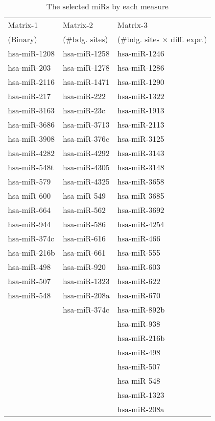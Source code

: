 \documentclass{scrartcl}
\numberwithin{figure}{section}
\numberwithin{table}{section}
\begin{document}
\begin{table}[h!]
  \centering
  \caption{The selected miRs by each measure}
  \label{tab:sel}
\bigskip
  \begin{tabular}{lll}
    \toprule
    Matrix-1     & Matrix-2     & Matrix-3     \\
    {\small(Binary)} & {\small(\#bdg. sites)} & {\small(\#bdg. sites $\times$ diff. expr.)} \\
    \midrule
    hsa-miR-1208 & hsa-miR-1258 & hsa-miR-1246 \\
    hsa-miR-203  & hsa-miR-1278 & hsa-miR-1286 \\
    hsa-miR-2116 & hsa-miR-1471 & hsa-miR-1290 \\
    hsa-miR-217  & hsa-miR-222  & hsa-miR-1322 \\
    hsa-miR-3163 & hsa-miR-23c  & hsa-miR-1913 \\
    hsa-miR-3686 & hsa-miR-3713 & hsa-miR-2113 \\
    hsa-miR-3908 & hsa-miR-376c & hsa-miR-3125 \\
    hsa-miR-4282 & hsa-miR-4292 & hsa-miR-3143 \\
    hsa-miR-548t & hsa-miR-4305 & hsa-miR-3148 \\
    hsa-miR-579  & hsa-miR-4325 & hsa-miR-3658 \\
    hsa-miR-600  & hsa-miR-549  & hsa-miR-3685 \\
    hsa-miR-664  & hsa-miR-562  & hsa-miR-3692 \\
    hsa-miR-944  & hsa-miR-586  & hsa-miR-4254 \\
    hsa-miR-374c & hsa-miR-616  & hsa-miR-466  \\
    hsa-miR-216b & hsa-miR-661  & hsa-miR-555  \\
    hsa-miR-498  & hsa-miR-920  & hsa-miR-603  \\
    hsa-miR-507  & hsa-miR-1323 & hsa-miR-622  \\
    hsa-miR-548  & hsa-miR-208a & hsa-miR-670  \\
                 & hsa-miR-374c & hsa-miR-892b \\
                 &              & hsa-miR-938  \\
                 &              & hsa-miR-216b \\
                 &              & hsa-miR-498  \\
                 &              & hsa-miR-507  \\
                 &              & hsa-miR-548  \\
                 &              & hsa-miR-1323 \\
                 &              & hsa-miR-208a \\
    \bottomrule
  \end{tabular}
\end{table}
\end{document}
